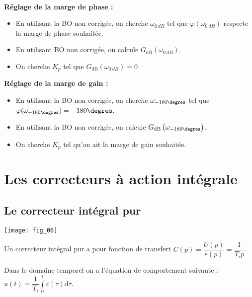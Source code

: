 \begin{methode} ~\\
\vspace{-1cm}
\begin{multicols}{2}
\textbf{Réglage de la marge de phase :}
\begin{itemize}
\item En utilisant la BO non corrigée, on cherche $\omega_{\SI{0}{dB}}$ tel que $\varphi(\omega_{\SI{0}{dB}})$ respecte la marge de phase souhaitée. 
\item En utilisant BO non corrigée, on calcule $G_{\text{dB}}\left(\omega_{\SI{0}{dB}}\right)$. 
\item On cherche $K_p$ tel que $G_{\text{dB}}\left(\omega_{\SI{0}{dB}}\right)=0$
\end{itemize}
\vspace{.25cm}

\vfill

\textbf{Réglage de la marge de gain :}
\begin{itemize}
\item En utilisant la BO non corrigée, on cherche $\omega_{-180\degres}$ tel que $\varphi(\omega_{-180\degres})=-180\degres$.
\item En utilisant la BO non corrigée, on calcule $G_{\text{dB}}\left(\omega_{-180\degres}\right)$. 
\item On cherche $K_p$ tel qu'on ait la marge de gain souhaitée.
\end{itemize}
\end{multicols}
\end{methode}

\section{Les correcteurs à action intégrale}

\subsection{Le correcteur intégral pur}


\begin{marginfigure}
\texttt{[image: fig\_06]}
\end{marginfigure}

\begin{defi}[Correcteur I]
Un correcteur intégral pur a pour fonction de transfert $C(p)=\dfrac{U(p)}{\varepsilon(p)}=\dfrac{1}{T_i p}$.

Dans le domaine temporel on a l'équation de comportement suivante : $u(t)=\dfrac{1}{T_i}\int\limits_0^t \varepsilon (\tau)\text{d}\tau$.
\end{defi}


